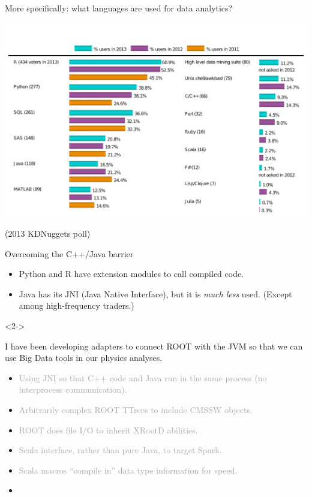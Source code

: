 \documentclass{beamer}
\begin{document}
\begin{frame}{}
\vfill
More specifically: what languages are used for data analytics?

\includegraphics[width=\linewidth]{KDNuggetsPoll.pdf}

\vfill
\scriptsize (2013 KDNuggets poll)
\end{frame}

\begin{frame}{Overcoming the C++/Java barrier}

\begin{itemize}
\item Python and R have extension modules to call compiled code.
\item Java has its JNI (Java Native Interface), but it is {\it much less} used. (Except among high-frequency traders.)
\end{itemize}

\begin{uncoverenv}<2->
\begin{block}{}
\vspace{-\baselineskip}
I have been developing adapters to connect ROOT with the JVM so that we can use Big Data tools in our physics analyses.

\begin{itemize}
\item \textcolor{darkgrey}{Using JNI so that C++ code and Java run in the same process (no interprocess communication).}
\item \textcolor{darkgrey}{Arbitrarily complex ROOT TTrees to include CMSSW objects.}
\item \textcolor{darkgrey}{ROOT does file I/O to inherit XRootD abilities.}
\item \textcolor{darkgrey}{Scala interface, rather than pure Java, to target Spark.}
\item \textcolor{darkgrey}{Scala macros ``compile in'' data type information for speed.}
\item {}
\end{itemize}
\end{block}
\end{uncoverenv}
\end{frame}
\end{document}
